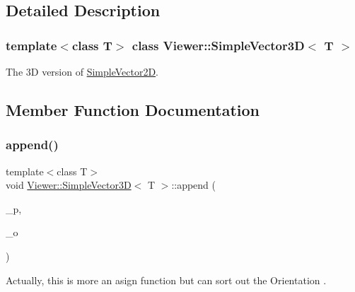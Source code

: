 \subsection{Detailed Description}
\subsubsection*{template$<$class T$>$\newline
class Viewer\+::\+Simple\+Vector3\+D$<$ T $>$}

The 3D version of \mbox{\hyperlink{classViewer_1_1SimpleVector2D}{Simple\+Vector2D}}. 

\subsection{Member Function Documentation}
\mbox{\label{classViewer_1_1SimpleVector3D_a124240f41e6e79f30079e9403d1ba75f}} 
\subsubsection{\texorpdfstring{append()}{append()}\hspace{0.1cm}{\footnotesize\ttfamily [1/2]}}
{\footnotesize\ttfamily template$<$class T$>$ \\
void \mbox{\hyperlink{classViewer_1_1SimpleVector3D}{Viewer\+::\+Simple\+Vector3D}}$<$ T $>$\+::append (\begin{DoxyParamCaption}\item[{const Q\+Point \&}]{\+\_\+p,  }\item[{const Orientation $\ast$}]{\+\_\+o }\end{DoxyParamCaption})\hspace{0.3cm}{\ttfamily [inline]}}

Actually, this is more an asign function but can sort out the Orientation . \mbox{\label{classViewer_1_1SimpleVector3D_af4c356b63832388d9f3a7f6329692ad1}} 
